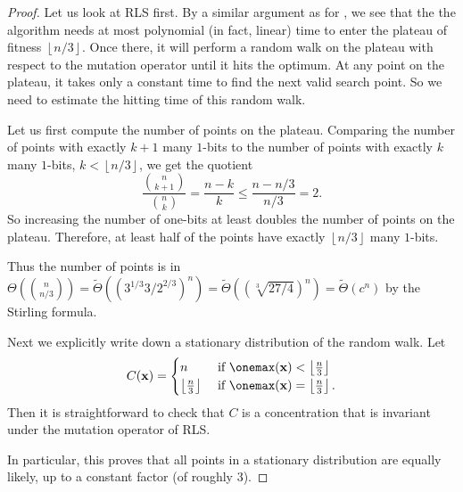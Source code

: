 \begin{proof}

 Let us look at RLS first. By a similar argument as for \onemax, we see that the the algorithm needs at most polynomial (in fact, linear) time to enter the plateau of fitness $\left\lfloor   n/3 \right\rfloor$. Once there, it will perform a random walk on the plateau with respect to the mutation operator until it hits the optimum. At any point on the plateau, it takes only a constant time to find the next valid search point. So we need to estimate the hitting time of this random walk.

Let us first compute the number of points on the plateau. Comparing the number of points with exactly $k+1$ many $1$-bits to the number of points with exactly $k$ many $1$-bits, $k<\left\lfloor   n/3 \right\rfloor$, we get the quotient 
\[
\frac{\binom{n}{k+1}}{\binom{n}{k}} = \frac{n-k}{k} \leq \frac{n-n/3}{n/3} = 2.
\]
So increasing the number of one-bits at least doubles the number of points on the plateau. Therefore, at least half of the points have exactly $\left\lfloor   n/3 \right\rfloor$ many $1$-bits.

Thus the number of points is in $\Theta(\binom{n}{n/3}) = \tilde{\Theta}((3^{1/3}{3/2}^{2/3})^n) = \tilde{\Theta}((\sqrt[3]{27/4})^n) = \tilde{\Theta}(c^n)$ by the Stirling formula.

Next we explicitly write down a stationary distribution of the random walk. Let 
\[
C(\mathbf{x}) = 
\begin{cases}
n & \text{ if } \onemax(\mathbf{x}) < \left\lfloor   \frac{n}{3} \right\rfloor \\
\left\lfloor   \frac{n}{3} \right\rfloor & \text{ if }\onemax(\mathbf{x}) = \left\lfloor   \frac{n}{3} \right\rfloor.
\end{cases}
\]
Then it is straightforward to check that $C$ is a concentration that is invariant under the mutation operator of RLS.

In particular, this proves that all points in a stationary distribution are equally likely, up to a constant factor (of roughly $3$).


\end{proof}



